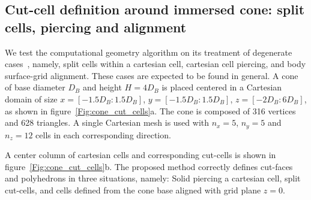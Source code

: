 \documentclass[12pt]{article}
\begin{document}


\clearpage

\subsection{Cut-cell definition around immersed cone: split cells, piercing and alignment}

\label{cone_test}
We test the computational geometry algorithm on its treatment of degenerate cases~\cite{Berger:2017}, namely, split cells within a cartesian cell, cartesian cell piercing, and body surface-grid alignment. These cases are expected to be found in general. A cone of base diameter $D_B$ and height $H=4D_B$ is placed centered in a Cartesian domain of size $x=[-1.5D_B:1.5D_B]$, $y=[-1.5D_B:1.5D_B]$, $z=[-2D_B:6D_B]$, as shown in figure~\ref{Fig:cone_cut_cells}a. The cone is composed of 316 vertices and 628 triangles. A single Cartesian mesh is used with $n_x=5$, $n_y=5$ and $n_z=12$ cells in each corresponding direction. 

A center column of cartesian cells and corresponding cut-cells is shown in figure~\ref{Fig:cone_cut_cells}b. The proposed method correctly defines cut-faces and polyhedrons in three situations, namely: Solid piercing a cartesian cell, split cut-cells, and cells defined from the cone base aligned with grid plane $z=0$.
\end{document}
